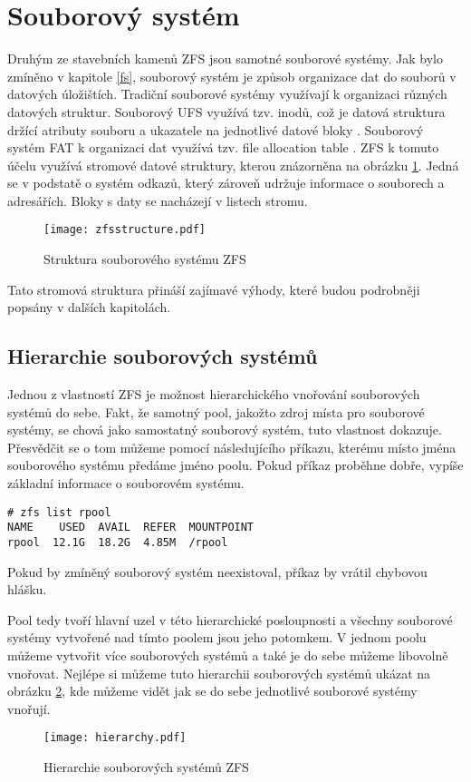 \section{Souborový systém}
Druhým ze stavebních kamenů ZFS jsou samotné souborové systémy. Jak bylo zmíněno v kapitole \ref{fs}, souborový systém je způsob organizace dat do souborů v datových úložištích.
Tradiční souborové systémy využívají k organizaci různých datových struktur. Souborový UFS využívá tzv. inodů, což je datová struktura držící atributy souboru a ukazatele na jednotlivé datové bloky \cite{ufs}. Souborový systém FAT k organizaci dat využívá tzv. file allocation table \cite{fat}. ZFS k tomuto účelu využívá stromové datové struktury, kterou znázorněna na obrázku \ref{structure}. Jedná se v podstatě o systém odkazů, který zároveň udržuje informace o souborech a adresářích. Bloky s daty se nacházejí v listech stromu.
\begin{figure}[!h]
    \caption{Struktura souborového systému ZFS}
    \label{structure}
    \centering
    \texttt{[image: zfsstructure.pdf]}
\end{figure}

Tato stromová struktura přináší zajímavé výhody, které budou podrobněji popsány v dalších kapitolách.

\subsection{Hierarchie souborových systémů}
\label{hiararchy}
Jednou z vlastností ZFS je možnost hierarchického vnořování souborových systémů do sebe. Fakt, že samotný pool, jakožto zdroj místa pro souborové systémy, se chová jako samostatný souborový systém, tuto vlastnost dokazuje. Přesvědčit se o tom můžeme pomocí následujícího příkazu, kterému místo jména souborového systému předáme jméno poolu. Pokud příkaz proběhne dobře, vypíše základní informace o souborovém systému.
\begin{verbatim}
# zfs list rpool
NAME    USED  AVAIL  REFER  MOUNTPOINT
rpool  12.1G  18.2G  4.85M  /rpool
\end{verbatim}
Pokud by zmíněný souborový systém neexistoval, příkaz by vrátil chybovou hlášku.

Pool tedy tvoří hlavní uzel v této hierarchické posloupnosti a všechny souborové systémy vytvořené nad tímto poolem jsou jeho potomkem. V jednom poolu můžeme vytvořit více souborových systémů a také je do sebe můžeme libovolně vnořovat. Nejlépe si můžeme tuto hierarchii souborových systémů ukázat na obrázku \ref{fshierarchy}, kde můžeme vidět jak se do sebe jednotlivé souborové systémy vnořují.
\begin{figure}[h]
    \caption{Hierarchie souborových systémů ZFS}
    \label{fshierarchy}
    \centering
    \texttt{[image: hierarchy.pdf]}
\end{figure}

